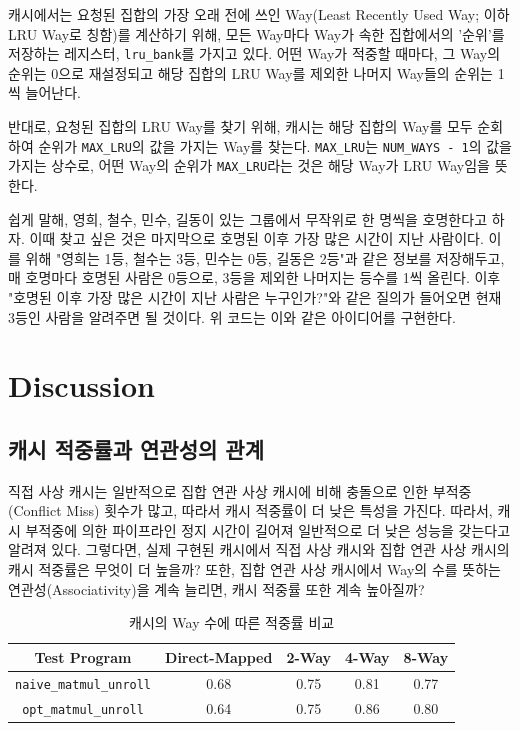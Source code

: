 \documentclass[openright, a4paper]{article}
\newcommand{\code}[1]{\texttt{#1}}
\begin{document}
\hfill

캐시에서는 요청된 집합의 가장 오래 전에 쓰인 Way(Least Recently Used Way; 이하 
LRU Way로 칭함)를 계산하기 위해, 모든 Way마다 Way가 속한 집합에서의 '순위'를 
저장하는 레지스터, \code{lru_bank}를 가지고 있다. 어떤 Way가 적중할 때마다, 그
Way의 순위는 0으로 재설정되고 해당 집합의 LRU Way를 제외한 나머지 Way들의 순위는 
1씩 늘어난다.

반대로, 요청된 집합의 LRU Way를 찾기 위해, 캐시는 해당 집합의 Way를 모두 순회하여
순위가 \code{MAX_LRU}의 값을 가지는 Way를 찾는다. \code{MAX_LRU}는 
\code{NUM_WAYS - 1}의 값을 가지는 상수로, 어떤 Way의 순위가 \code{MAX_LRU}라는
것은 해당 Way가 LRU Way임을 뜻한다.

쉽게 말해, 영희, 철수, 민수, 길동이 있는 그룹에서 무작위로 한 명씩을 호명한다고
하자. 이때 찾고 싶은 것은 마지막으로 호명된 이후 가장 많은 시간이 지난 사람이다. 
이를 위해 "영희는 1등, 철수는 3등, 민수는 0등, 길동은 2등"과 같은 정보를 
저장해두고, 매 호명마다 호명된 사람은 0등으로, 3등을 제외한 나머지는 등수를 1씩 
올린다. 이후 "호명된 이후 가장 많은 시간이 지난 사람은 누구인가?"와 같은 질의가 
들어오면 현재 3등인 사람을 알려주면 될 것이다. 위 코드는 이와 같은 아이디어를 
구현한다.


\section{Discussion}

\subsection{캐시 적중률과 연관성의 관계}

\hfill

직접 사상 캐시는 일반적으로 집합 연관 사상 캐시에 비해 충돌으로 인한 부적중
(Conflict Miss) 횟수가 많고, 따라서 캐시 적중률이 더 낮은 특성을 가진다. 따라서,
캐시 부적중에 의한 파이프라인 정지 시간이 길어져 일반적으로 더 낮은 성능을
갖는다고 알려져 있다. 그렇다면, 실제 구현된 캐시에서 직접 사상 캐시와 집합
연관 사상 캐시의 캐시 적중률은 무엇이 더 높을까? 또한, 집합 연관 사상 캐시에서
Way의 수를 뜻하는 연관성(Associativity)을 계속 늘리면, 캐시 적중률 또한 계속
높아질까?

\hfill

\begin{table}[!h]
  \centering
  \begin{tabular}{@{}ccccc@{}}
    \hline
    Test Program & Direct-Mapped & 2-Way & 4-Way & 8-Way \\
    \hline
    \code{naive_matmul_unroll} & 0.68 & 0.75 & 0.81 & 0.77 \\
    \code{opt_matmul_unroll} & 0.64 & 0.75 & 0.86 & 0.80 \\
    \hline
  \end{tabular}
  \caption{캐시의 Way 수에 따른 적중률 비교}
  \label{tab:comparison}
\end{table}
\end{document}
